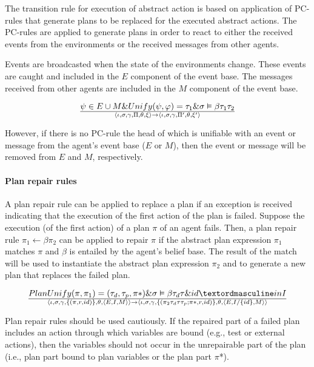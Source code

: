 \documentclass[a4paper]{article}
\begin{document}
The transition rule for execution of abstract action is based on application of PC-rules that generate plans to be replaced for the executed abstract actions. The PC-rules are applied to generate plans in order to react to either the received events from the environments or the received messages from other agents.

Events are broadcasted when the state of the environments change. These events are caught and included in the $E$ component of the event base. The messages received from other agents are included in the $M$ component of the event base.

$${ \psi \in E \cup M \& Unify(\psi, \varphi) = \tau_{1} \& \sigma \vDash \beta \tau_{1} \tau_{2} } \over {\langle \iota, \sigma, \gamma, \Pi, \theta, \xi \rangle \rightarrow \langle \iota, \sigma, \gamma, \Pi', \theta, \xi' \rangle}$$

However, if there is no PC-rule the head of which is unifiable with an event or message from the agent's event base ($E$ or $M$), then the event or message will be removed from $E$ and $M$, respectively.

\paragraph{Plan repair rules}

A plan repair rule can be applied to replace a plan if an exception is received indicating that
the execution of the first action of the plan is failed. Suppose the execution (of the first action)
of a plan $\pi$ of an agent fails. Then, a plan repair rule $\pi_{1} \leftarrow \beta \pi_{2}$ can be applied to repair $\pi$ if the abstract plan expression $\pi_{1}$ matches $\pi$ and $\beta$ is entailed by the agent's belief base. The result of the match will be used to instantiate the abstract plan expression $\pi_{2}$ and to generate a new plan that replaces the failed plan.

$$ {Plan Unify(\pi, \pi_{1}) = (\tau_{d}, \tau_{p}, \pi *) \& \sigma \vDash \beta\tau_{d}\tau \& id ºin I} \over {\langle \iota, \sigma, \gamma, \{(\pi, r, id)\}, \theta, \langle E, I, M \rangle \rangle \rightarrow \langle \iota, \sigma, \gamma, \{(\pi_{2}\tau_{d}\tau\tau_{p};\pi *, r, id)\}, \theta, \langle E, I/\{id\}, M \rangle \rangle}$$

Plan repair rules should be used cautiously. If the repaired part of a failed plan includes an action through which variables are bound (e.g., test or external actions), then the variables should not occur in the unrepairable part of the plan (i.e., plan part bound to plan variables or the plan part $\pi$*).
\end{document}
